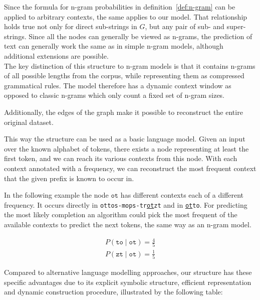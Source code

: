 \noindent
Since the formula for n-gram probabilities in definition~\ref{def:n-gram} can be applied to arbitrary contexts, the same applies to our model. That relationship holds true not only for direct sub-strings in $G$, but any pair of sub- and super-strings. Since all the nodes can generally be viewed as n-grams, the prediction of text can generally work the same as in simple n-gram models, although additional extensions are possible.\\
The key distinction of this structure to n-gram models is that it contains n-grams of all possible lengths from the corpus, while representing them as compressed grammatical rules. The model therefore has a dynamic context window as opposed to classic n-grams which only count a fixed set of n-gram sizes.

\noindent
Additionally, the edges of the graph make it possible to reconstruct the entire original dataset.

\noindent
This way the structure can be used as a basic language model. Given an input over the known alphabet of tokens, there exists a node representing at least the first token, and we can reach its various contexts from this node. With each context annotated with a frequency, we can reconstruct the most frequent context that the given prefix is known to occur in.

\noindent
In the following example the node $\texttt{ot}$ has different contexts each of a different frequency. It occurs directly in \texttt{ottos-mops-tr\underline{ot}zt} and in \texttt{\underline{ot}to}. For predicting the most likely completion an algorithm could pick the most frequent of the available contexts to predict the next tokens, the same way as an n-gram model.

\begin{multicols}{2}
    \noindent
    \begin{align*}
        P\left(\texttt{to} \mid \texttt{ot}\right) = \frac{4}{5}
    \end{align*}
    \begin{align*}
        P\left(\texttt{zt} \mid \texttt{ot}\right) = \frac{1}{5}
    \end{align*}
\end{multicols}
%
\noindent
Compared to alternative language modelling approaches, our structure has these specific advantages due to its explicit symbolic structure, efficient representation and dynamic construction procedure, illustrated by the following table:

